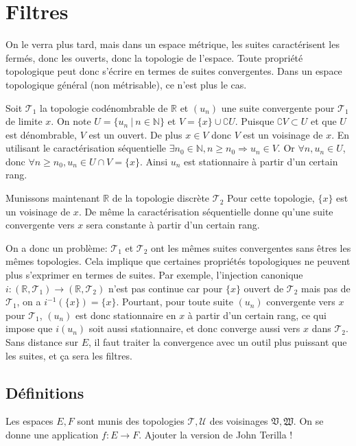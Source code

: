 \documentclass[a4paper, 11pt, french]{book}
\theoremstyle{plain} %
\theoremstyle{definition} %
\theoremstyle{remark} %
\newcommand{\1}{\mathds{1}}
\newcommand{\inv}[1]{#1^{-1}}
\newcommand{\N}{\mathbb{N}}
\newcommand{\R}{\mathbb{R}}
\renewcommand{\frak}[1]{\mathfrak{#1}}
\newcommand{\scr}[1]{\mathscr{#1}}
\newcommand\ens[2]{\{#1 \ |\ #2\}}
\begin{document}
\chapter{Filtres}

On le verra plus tard, mais dans un espace métrique, les suites caractérisent les fermés, donc les ouverts, donc la topologie de l’espace.
Toute propriété topologique peut donc s’écrire en termes de suites convergentes.
Dans un espace topologique général (non métrisable), ce n’est plus le cas.

Soit $\scr{T}_1$ la topologie codénombrable de $\R$ et $(u_n)$ une suite convergente pour $\scr{T}_1$ de limite $x$.
On note $U=\ens{u_n}{n\in\N}$ et $V=\{x\}\cup\complement U$.
Puisque $\complement V\subset U$ et que $U$ est dénombrable, $V$ est un ouvert.
De plus $x\in V$ donc $V$ est un voisinage de $x$.
En utilisant le caractérisation séquentielle $\exists n_0\in\N, n\geqslant n_0\Rightarrow u_n\in V$.
Or $\forall n, u_n\in U$, donc $\forall n\geqslant n_0, u_n\in U\cap V=\{x\}$.
Ainsi $u_n$ est stationnaire à partir d'un certain rang.

Munissons maintenant $\R$ de la topologie discrète $\scr{T}_2$
Pour cette topologie, $\{x\}$ est un voisinage de $x$.
De même la caractérisation séquentielle donne qu'une suite convergente vers $x$ sera constante à partir d'un certain rang.

On a donc un problème: $\scr{T}_1$ et $\scr{T}_2$ ont les mêmes suites convergentes sans êtres les mêmes topologies.
Cela implique que certaines propriétés topologiques ne peuvent plus s’exprimer en termes de suites.
Par exemple, l’injection canonique $i : (\R, \scr{T}_1)\rightarrow (\R, \scr{T}_2)$ n’est pas continue car pour $\{x\}$ ouvert de $\scr{T}_2$ mais pas de $\scr{T}_1$, on a $\inv{i}(\{x\})=\{x\}$.
Pourtant, pour toute suite $(u_n)$ convergente vers $x$ pour $\scr{T}_1$, $(u_n)$ est donc stationnaire en $x$ à partir d'un certain rang, ce qui impose que $i(u_n)$ soit aussi stationnaire, et donc converge aussi vers $x$ dans $\scr{T}_2$.
Sans distance sur $E$, il faut traiter la convergence avec un outil plus puissant que les suites, et ça sera les filtres.

\section{Définitions}

Les espaces $E, F$ sont munis des topologies $\scr{T}, \scr{U}$ des voisinages $\frak{V}, \frak{W}$.
On se donne une application $f:E\rightarrow F$.
{\color{red} Ajouter la version de John Terilla !}
\end{document}
